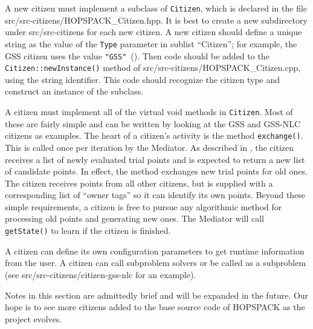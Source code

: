 A new citizen must implement a subclass of {\tt Citizen}, which is declared
in the file {\sf src/src-citizens/HOPSPACK\_Citizen.hpp}.
It is best to create a new
subdirectory under {\sf src/src-citizens} for each new citizen.
A new citizen should define a unique string as the value of the
{\tt Type} parameter in sublist ``Citizen''; for example, the GSS citizen
uses the value {\tt "GSS"}~().
Then code should be added to the {\tt Citizen::newInstance()} method of
{\sf src/src-citizens/HOPSPACK\_Citizen.cpp}, using the string identifier.
This code should recognize the citizen type and construct
an instance of the subclass.

A citizen must implement all of the virtual void methods in {\tt Citizen}.
Most of these are fairly simple and can be written by looking at
the GSS and GSS-NLC citizens as examples.
The heart of a citizen's activity is the method {\tt exchange()}.
This is called once per iteration by the Mediator.  As described in
, the citizen receives a list of newly evaluated
trial points and is expected to return a new list of candidate points.
In effect, the method exchanges new trial points for old ones.  The citizen
receives points from all other citizens, but is supplied with a corresponding
list of ``owner tags'' so it can identify its own points.  Beyond these
simple requirements, a citizen is free to pursue any algorithmic method
for processing old points and generating new ones.  The Mediator will
call {\tt getState()} to learn if the citizen is finished.

A citizen can define its own configuration parameters to get runtime
information from the user.  A citizen can call subproblem solvers or be
called as a subproblem (see {\sf src/src-citizens/citizen-gss-nlc} for
an example).

Notes in this section are admittedly brief and will be expanded in the future.
Our hope is to see more citizens added to the base source code of HOPSPACK
as the project evolves.
